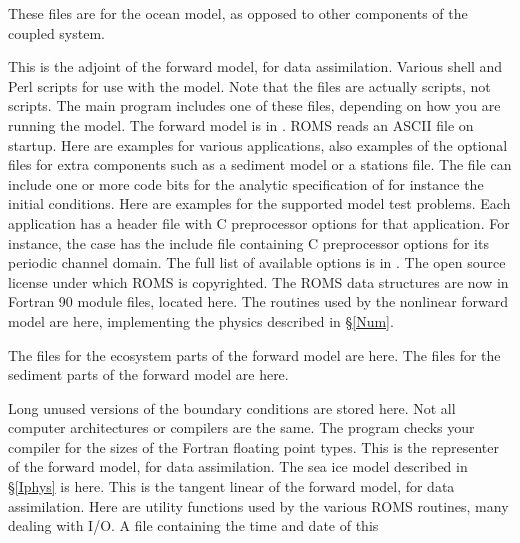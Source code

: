 \begin{klist}
  These files are for the ocean model, as opposed to other components of
  the coupled system.
\begin{klist}
   This is the adjoint of the forward model, for data
    assimilation.
   Various shell and Perl scripts for use with the model.
    Note that the  files are actually  scripts, not
     scripts.
   The main program includes one of these files,
    depending on how you are running the model. The forward model is in
    .
   ROMS reads an ASCII file on startup. Here are
    examples for various applications, also examples of the optional
    files for extra components such as a sediment model or a stations
    file.
   The file  can include one
    or more code bits for the analytic specification of for instance the
    initial conditions. Here are examples for the supported model test
    problems.
   Each application has a header file with C
    preprocessor options for that application. For instance, the
     case has the include file 
    containing C preprocessor options for its periodic channel domain.
    The full list of available options is in .
   The open source license under which ROMS
    is copyrighted.
   The ROMS data structures are now in Fortran 90
    module files, located here.
   The routines used by the nonlinear forward model
    are here, implementing the physics described in \S\ref{Num}.
  \begin{klist}
     The files for the ecosystem parts of the forward
    model are here.
     The files for the sediment parts of the forward
    model are here.
  \end{klist}
   Long unused versions of the boundary conditions
    are stored here.
   Not all computer architectures or compilers are the same.
    The  program checks your compiler for the sizes of the
    Fortran floating point types.
   This is the representer of the forward model, for
    data assimilation.
   The sea ice model described in \S\ref{Iphys} is here.
   This is the tangent linear of the forward model, for data
    assimilation.
   Here are utility functions used by the various
    ROMS routines, many dealing with I/O.
   A file containing the time and date of this

\end{klist}
\end{klist}
